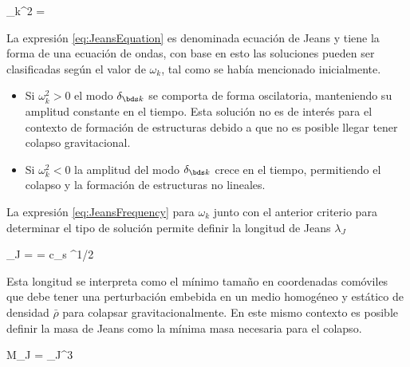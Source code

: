 {\omega_k^2 =  }
	

La expresión \ref{eq:JeansEquation} es denominada ecuación de Jeans y 
tiene la forma de una ecuación de ondas, con base en esto las soluciones 
pueden ser clasificadas según el valor de $\omega_k$, tal como se había
mencionado inicialmente.


\begin{itemize}
\item Si $\omega_k^2>0$ el modo $\delta_{\bds k}$ se comporta de forma 
oscilatoria, manteniendo su amplitud constante en el tiempo. Esta solución
no es de interés para el contexto de formación de estructuras debido a que
no es posible llegar tener colapso gravitacional.

\item Si $\omega_k^2<0$ la amplitud del modo $\delta_{\bds k}$ crece en el 
tiempo, permitiendo el colapso y la formación de estructuras no lineales.
\end{itemize}


La expresión \ref{eq:JeansFrequency} para $\omega_k$ junto con el anterior 
criterio para determinar el tipo de solución permite definir la longitud 
de Jeans $\lambda_J$


{ \lambda_J =  = 
c_s ^{1/2} }


Esta longitud se interpreta como el mínimo tamaño en coordenadas comóviles 
que debe tener una perturbación embebida en un medio homogéneo y estático
de densidad $\bar \rho$ para colapsar gravitacionalmente. En este mismo 
contexto es posible definir la masa de Jeans como la mínima masa necesaria
para el colapso.


{ M_J = \pi \lambda_J^3 \propto {} }


